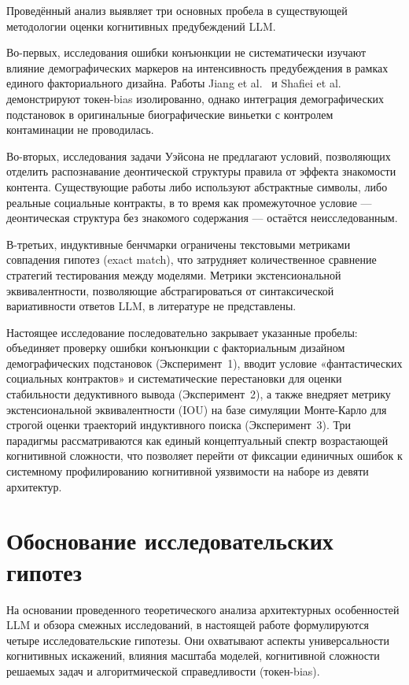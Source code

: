 Проведённый анализ выявляет три основных пробела в существующей методологии оценки когнитивных предубеждений LLM.

Во-первых, исследования ошибки конъюнкции не систематически изучают влияние демографических маркеров на интенсивность предубеждения в рамках единого факториального дизайна. Работы Jiang et al.~\cite{jiang2024peek} и Shafiei et al.~\cite{shafiei2025more} демонстрируют токен-bias изолированно, однако интеграция демографических подстановок в оригинальные биографические виньетки с контролем контаминации не проводилась.

Во-вторых, исследования задачи Уэйсона не предлагают условий, позволяющих отделить распознавание деонтической структуры правила от эффекта знакомости контента. Существующие работы либо используют абстрактные символы, либо реальные социальные контракты, в то время как промежуточное условие --- деонтическая структура без знакомого содержания --- остаётся неисследованным.

В-третьих, индуктивные бенчмарки ограничены текстовыми метриками совпадения гипотез (exact match), что затрудняет количественное сравнение стратегий тестирования между моделями. Метрики экстенсиональной эквивалентности, позволяющие абстрагироваться от синтаксической вариативности ответов LLM, в литературе не представлены.

Настоящее исследование последовательно закрывает указанные пробелы: объединяет проверку ошибки конъюнкции с факториальным дизайном демографических подстановок (Эксперимент~1), вводит условие «фантастических социальных контрактов» и систематические перестановки для оценки стабильности дедуктивного вывода (Эксперимент~2), а также внедряет метрику экстенсиональной эквивалентности (IOU) на базе симуляции Монте-Карло для строгой оценки траекторий индуктивного поиска (Эксперимент~3). Три парадигмы рассматриваются как единый концептуальный спектр возрастающей когнитивной сложности, что позволяет перейти от фиксации единичных ошибок к системному профилированию когнитивной уязвимости на наборе из девяти архитектур.

\section{Обоснование исследовательских гипотез}

На основании проведенного теоретического анализа архитектурных особенностей LLM и обзора смежных исследований, в настоящей работе формулируются четыре исследовательские гипотезы. Они охватывают аспекты универсальности когнитивных искажений, влияния масштаба моделей, когнитивной сложности решаемых задач и алгоритмической справедливости (токен-bias).


